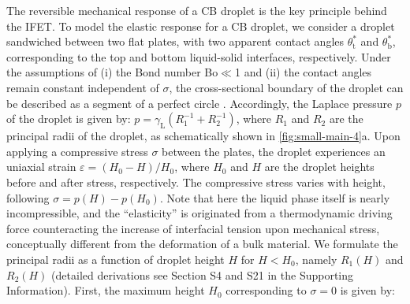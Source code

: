 The reversible mechanical response of a CB droplet is the key
principle behind the IFET. To model the elastic response for a CB
droplet, we consider a droplet sandwiched between two flat plates,
with two apparent contact angles \(\theta_{\mathrm{t}}^{*}\) and
\(\theta_{\mathrm{b}}^{*}\), corresponding to the top and bottom
liquid-solid interfaces, respectively. Under the assumptions of (i)
the Bond number Bo\(\ll\)1 and (ii) the contact angles remain
constant independent of \(\sigma\), the cross-sectional boundary of the
droplet can be described as a segment of a perfect circle
\cite{berthier_2012_microdroplet}. Accordingly, the Laplace pressure
\(p\) of the droplet is given by: \(p = \gamma_{\mathrm{L}}
 (R_{1}^{-1} + R_{2}^{-1})\), where \(R_{1}\) and \(R_{2}\) are the
principal radii of the droplet, as schematically shown in 
\autoref{fig:small-main-4}a. Upon applying a compressive stress \(\sigma\) between
the plates, the droplet experiences an uniaxial strain \(\varepsilon =
 (H_{0} - H) / H_{0}\), where \(H_{0}\) and \(H\) are the droplet heights
before and after stress, respectively. The compressive stress varies
with height, following \(\sigma = p(H) - p(H_{0})\). Note that here the
liquid phase itself is nearly incompressible, and the ``elasticity'' is
originated from a thermodynamic driving force counteracting the
increase of interfacial tension upon mechanical stress, conceptually
different from the deformation of a bulk material. We formulate the
principal radii as a function of droplet height \(H\) for \(H < H_{0}\),
namely \(R_{1}(H)\) and \(R_{2}(H)\) (detailed derivations see Section S4
and  S21 in the Supporting Information). First, the maximum
height \(H_{0}\) corresponding to \(\sigma=0\) is given by:

